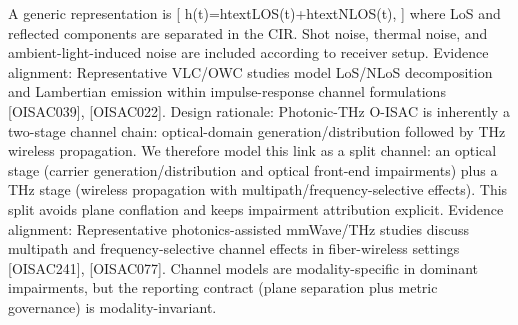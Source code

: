 {}A generic representation is\markdownRendererSoftLineBreak
{}[\markdownRendererSoftLineBreak
{}h(t)=h\markdownRendererUnderscore{}\markdownRendererLeftBrace{}\markdownRendererBackslash{}text\markdownRendererLeftBrace{}LOS\markdownRendererRightBrace{}\markdownRendererRightBrace{}(t)+h\markdownRendererUnderscore{}\markdownRendererLeftBrace{}\markdownRendererBackslash{}text\markdownRendererLeftBrace{}NLOS\markdownRendererRightBrace{}\markdownRendererRightBrace{}(t),\markdownRendererSoftLineBreak
{}]\markdownRendererSoftLineBreak
{}where LoS and reflected components are separated in the CIR. Shot noise, thermal noise, and ambient-light-induced noise are included according to receiver setup.\markdownRendererParagraphSeparator
{}Evidence alignment: Representative VLC/OWC studies model LoS/NLoS decomposition and Lambertian emission within impulse-response channel formulations [O\markdownRendererUnderscore{}ISAC\markdownRendererUnderscore{}039], [O\markdownRendererUnderscore{}ISAC\markdownRendererUnderscore{}022].\markdownRendererInterblockSeparator
{}
\markdownRendererSectionEnd \markdownRendererSectionBegin
{}\markdownRendererInterblockSeparator
{}Design rationale: Photonic-THz O-ISAC is inherently a two-stage channel chain: optical-domain generation/distribution followed by THz wireless propagation.\markdownRendererParagraphSeparator
{}We therefore model this link as a split channel: an optical stage (carrier generation/distribution and optical front-end impairments) plus a THz stage (wireless propagation with multipath/frequency-selective effects). This split avoids plane conflation and keeps impairment attribution explicit.\markdownRendererParagraphSeparator
{}Evidence alignment: Representative photonics-assisted mmWave/THz studies discuss multipath and frequency-selective channel effects in fiber-wireless settings [O\markdownRendererUnderscore{}ISAC\markdownRendererUnderscore{}241], [O\markdownRendererUnderscore{}ISAC\markdownRendererUnderscore{}077].\markdownRendererParagraphSeparator
{} Channel models are modality-specific in dominant impairments, but the reporting contract (plane separation plus metric governance) is modality-invariant.\markdownRendererInterblockSeparator
{}\markdownRendererThematicBreak{}\markdownRendererInterblockSeparator
{}
\markdownRendererSectionEnd 
\markdownRendererSectionEnd \markdownRendererSectionBegin
{}\markdownRendererInterblockSeparator
